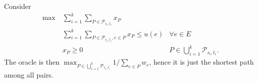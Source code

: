 \begin{eg}
	Consider
	\[
		\begin{aligned}
			\max~ & \sum_{i=1}^{k} \sum_{P \in \mathcal{P} _{s_i, t_i}} x_P                                                                       \\
			      & \sum_{i=1}^{k} \sum_{P \in \mathcal{P} _{s_i, t_i}, e \in P} x_P \leq u(e) & \forall e\in E                                   \\
			      & x_P \geq 0                                                                 & P \in \bigcup_{i=1}^{k} \mathcal{P} _{s_i, t_i}.
		\end{aligned}
	\]
	The oracle is then \(\max _{P \in \bigcup_{i=1}^{k} \mathcal{P} _{s_i, t_i}} 1 / \sum_{e \in P} w_e\), hence it is just the shortest path among all pairs.
\end{eg}
